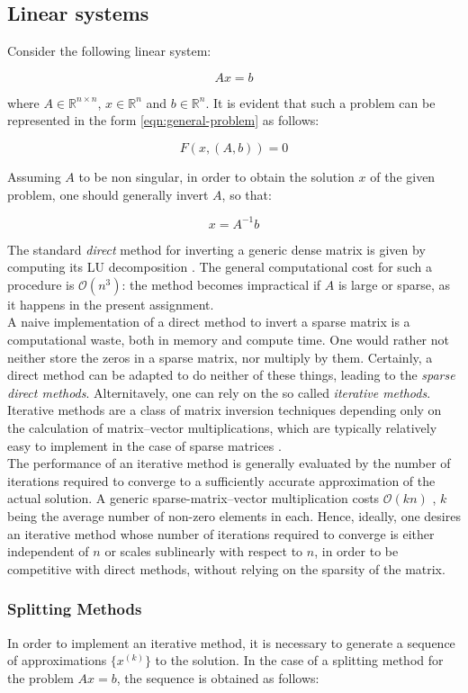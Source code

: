 \documentclass{article}
\theoremstyle{theorem}
\theoremstyle{definition}
\begin{document}
\subsection{Linear systems}
Consider the following linear system:

$$Ax=b$$

where $A\in\mathbb{R}^{n\times n}$, $x\in\mathbb{R}^n$ and $b\in\mathbb{R}^n$. It is evident that such a problem can be represented in the form \eqref{eqn:general-problem} as follows:

$$F(x,(A,b))=0$$ 

Assuming $A$ to be non singular, in order to obtain the solution $x$ of the given problem, one should generally invert $A$, so that:

$$x=A^{-1}b$$ 

The standard \emph{direct} method for inverting a generic dense matrix is given by computing its LU decomposition \cite{lec-notes}. The general computational cost for such a procedure is $\mathcal{O}(n^3)$: the method becomes impractical if $A$ is large or sparse, as it happens in the present assignment.\\
A naive implementation of a direct method to invert a sparse matrix is a computational waste, both in memory and compute time. One would rather not neither store the zeros in a sparse matrix, nor multiply by them. Certainly, a direct method can be adapted to do neither of these things, leading to the \emph{sparse direct methods}. Alternitavely, one can rely on the so called \emph{iterative methods}. Iterative methods are a class of matrix inversion techniques depending only on the calculation of matrix–vector multiplications, which are typically relatively easy to implement in the case of sparse matrices \cite{lec-notes}.\\
The performance of an iterative method is generally evaluated by the number of iterations required to converge to a sufficiently accurate approximation of the actual solution. A generic sparse-matrix–vector multiplication costs $\mathcal{O}(kn)$ , $k$ being the average number of non-zero elements in each. Hence, ideally, one desires an iterative method whose number of iterations required to converge is either independent of $n$ or scales sublinearly with respect to $n$, in order to be competitive with direct methods, without relying on the sparsity of the matrix.\\

\subsubsection{Splitting Methods}
In order to implement an iterative method, it is necessary to generate a sequence of approximations $\lbrace x^{(k)}\rbrace$ to the solution. In the case of a splitting method for the problem $Ax=b$, the sequence is obtained as follows:
\end{document}

